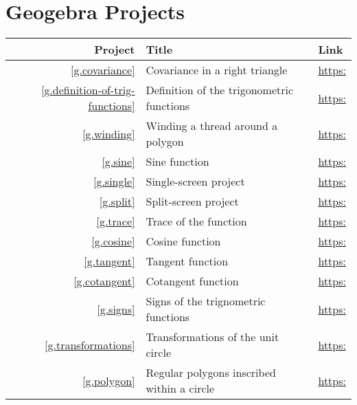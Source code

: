 
\chapter{Geogebra Projects}\label{a.geogebra}

\begin{center}
\begin{tabular}{|r|p{7cm}|p{6cm}|}
\hline
Project & Title & Link\\
\hline
\ref{g.covariance} & Covariance in a right triangle & 
  \url{https:}\\\hline

\ref{g.definition-of-trig-functions} & Definition of the trigonometric functions & 
  \url{https:}\\\hline

\ref{g.winding} & Winding a thread around a polygon &
  \url{https:}\\\hline

\ref{g.sine} & Sine function & 
  \url{https:}\\\hline

\ref{g.single} & Single-screen project & 
  \url{https:}\\\hline

\ref{g.split} & Split-screen project & 
  \url{https:}\\\hline

\ref{g.trace} & Trace of the function & 
  \url{https:}\\\hline

\ref{g.cosine} & Cosine function & 
  \url{https:}\\\hline

\ref{g.tangent} & Tangent function & 
  \url{https:}\\\hline

\ref{g.cotangent} & Cotangent function &
  \url{https:}\\\hline

\ref{g.signs} & Signs of the trignometric functions &
  \url{https:}\\\hline

\ref{g.transformations} & Transformations of the unit circle &
  \url{https:}\\\hline

\ref{g.polygon} & Regular polygons inscribed within a circle & 
  \url{https:}\\\hline
\end{tabular}
\end{center}
